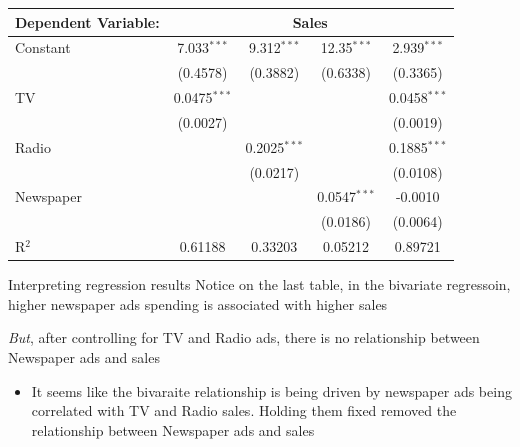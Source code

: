 \documentclass[aspectratio=169,t,11pt,table]{beamer}
\begin{document}
\begin{frame}{}{}
  \bigskip
  \begin{center}
    \small
    \begin{tabular}{lcccc}
      \toprule
      Dependent Variable: & \multicolumn{4}{c}{Sales}\\
      \midrule
      Constant     & 7.033$^{***}$  & 9.312$^{***}$  & 12.35$^{***}$  & 2.939$^{***}$\\   
                    & (0.4578)       & (0.3882)       & (0.6338)       & (0.3365)\\   
      TV           & 0.0475$^{***}$ &                &                & 0.0458$^{***}$\\   
                    & (0.0027)       &                &                & (0.0019)\\   
      Radio        &                & 0.2025$^{***}$ &                & 0.1885$^{***}$\\   
                    &                & (0.0217)       &                & (0.0108)\\   
      Newspaper    &                &                & 0.0547$^{***}$ & -0.0010\\   
                    &                &                & (0.0186)       & (0.0064)\\   
      \midrule
      R$^2$        & 0.61188        & 0.33203        & 0.05212        & 0.89721\\  
      \bottomrule
    \end{tabular}
  \end{center}
\end{frame}

\begin{frame}{Interpreting regression results}
  Notice on the last table, in the bivariate regressoin, higher newspaper ads spending is associated with higher sales

  \bigskip
  \emph{But}, after controlling for TV and Radio ads, there is no relationship between Newspaper ads and sales
  \begin{itemize}
    \item It seems like the bivaraite relationship is being driven by newspaper ads being correlated with TV and Radio sales. 
    Holding them fixed removed the relationship between Newspaper ads and sales
  \end{itemize}
\end{frame}
\end{document}
